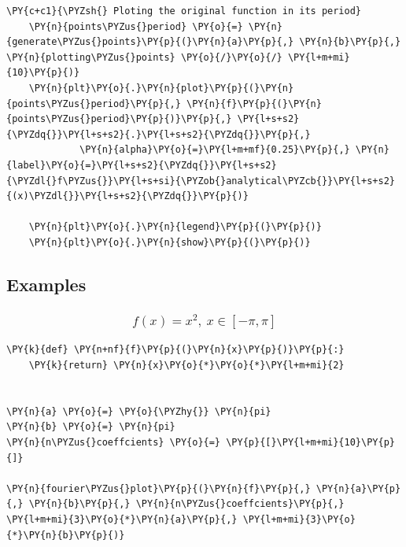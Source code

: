 \begin{tcolorbox}[breakable, size=fbox, boxrule=1pt, pad at break*=1mm,colback=cellbackground, colframe=cellborder]
\begin{Verbatim}[commandchars=\\\{\}]
    \PY{c+c1}{\PYZsh{} Ploting the original function in its period}
    \PY{n}{points\PYZus{}period} \PY{o}{=} \PY{n}{generate\PYZus{}points}\PY{p}{(}\PY{n}{a}\PY{p}{,} \PY{n}{b}\PY{p}{,} \PY{n}{plotting\PYZus{}points} \PY{o}{/}\PY{o}{/} \PY{l+m+mi}{10}\PY{p}{)}
    \PY{n}{plt}\PY{o}{.}\PY{n}{plot}\PY{p}{(}\PY{n}{points\PYZus{}period}\PY{p}{,} \PY{n}{f}\PY{p}{(}\PY{n}{points\PYZus{}period}\PY{p}{)}\PY{p}{,} \PY{l+s+s2}{\PYZdq{}}\PY{l+s+s2}{.}\PY{l+s+s2}{\PYZdq{}}\PY{p}{,}
             \PY{n}{alpha}\PY{o}{=}\PY{l+m+mf}{0.25}\PY{p}{,} \PY{n}{label}\PY{o}{=}\PY{l+s+s2}{\PYZdq{}}\PY{l+s+s2}{\PYZdl{}f\PYZus{}}\PY{l+s+si}{\PYZob{}analytical\PYZcb{}}\PY{l+s+s2}{(x)\PYZdl{}}\PY{l+s+s2}{\PYZdq{}}\PY{p}{)}

    \PY{n}{plt}\PY{o}{.}\PY{n}{legend}\PY{p}{(}\PY{p}{)}
    \PY{n}{plt}\PY{o}{.}\PY{n}{show}\PY{p}{(}\PY{p}{)}
\end{Verbatim}
\end{tcolorbox}

    \hypertarget{examples}{%
\subsection{Examples}\label{examples}}

    \hypertarget{fx-x2-x-in--pi-pi}{%
\subsubsection{\texorpdfstring{\[f(x) = x^2,\ x \in [-\pi, \pi]\]}{f(x) = x\^{}2,\textbackslash{} x \textbackslash in {[}-\textbackslash pi, \textbackslash pi{]}}}\label{fx-x2-x-in--pi-pi}}

    \begin{tcolorbox}[breakable, size=fbox, boxrule=1pt, pad at break*=1mm,colback=cellbackground, colframe=cellborder]
\begin{Verbatim}[commandchars=\\\{\}]
\PY{k}{def} \PY{n+nf}{f}\PY{p}{(}\PY{n}{x}\PY{p}{)}\PY{p}{:}
    \PY{k}{return} \PY{n}{x}\PY{o}{*}\PY{o}{*}\PY{l+m+mi}{2}


\PY{n}{a} \PY{o}{=} \PY{o}{\PYZhy{}} \PY{n}{pi}
\PY{n}{b} \PY{o}{=} \PY{n}{pi}
\PY{n}{n\PYZus{}coeffcients} \PY{o}{=} \PY{p}{[}\PY{l+m+mi}{10}\PY{p}{]}

\PY{n}{fourier\PYZus{}plot}\PY{p}{(}\PY{n}{f}\PY{p}{,} \PY{n}{a}\PY{p}{,} \PY{n}{b}\PY{p}{,} \PY{n}{n\PYZus{}coeffcients}\PY{p}{,} \PY{l+m+mi}{3}\PY{o}{*}\PY{n}{a}\PY{p}{,} \PY{l+m+mi}{3}\PY{o}{*}\PY{n}{b}\PY{p}{)}
\end{Verbatim}
\end{tcolorbox}

